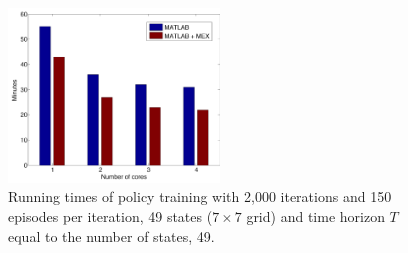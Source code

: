 \begin{figure}[!htp]
  \centering
  \includegraphics[width=0.5\textwidth]{figures/performance_improvement}
  \caption{Running times of policy training with 2,000 iterations and 150 episodes per iteration, 49 states ($7 \times 7$ grid) and time horizon $T$ equal to the number of states, 49.}
  \label{fig:PerformanceImprovement}
\end{figure}
